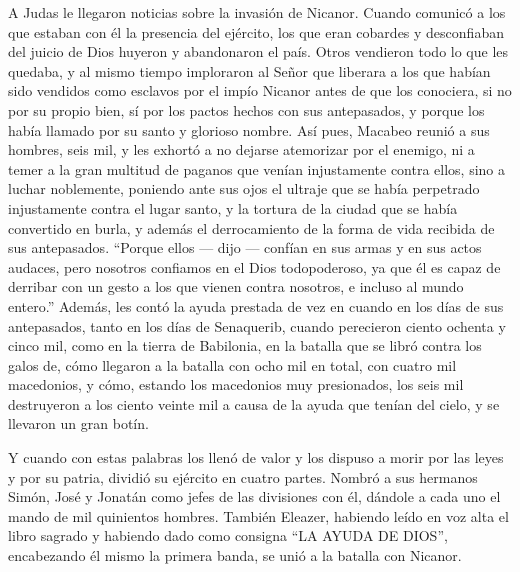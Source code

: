  A Judas le llegaron noticias sobre la invasión de
Nicanor. Cuando comunicó a los que estaban con él la presencia del
ejército,  los que eran cobardes y desconfiaban del
juicio de Dios huyeron y abandonaron el país.  Otros
vendieron todo lo que les quedaba, y al mismo tiempo imploraron al Señor
que liberara a los que habían sido vendidos como esclavos por el impío
Nicanor antes de que los conociera,  si no por su propio
bien, sí por los pactos hechos con sus antepasados, y porque los había
llamado por su santo y glorioso nombre.  Así pues,
Macabeo reunió a sus hombres, seis mil, y les exhortó a no dejarse
atemorizar por el enemigo, ni a temer a la gran multitud de paganos que
venían injustamente contra ellos, sino a luchar noblemente,
 poniendo ante sus ojos el ultraje que se había
perpetrado injustamente contra el lugar santo, y la tortura de la ciudad
que se había convertido en burla, y además el derrocamiento de la forma
de vida recibida de sus antepasados.  ``Porque ellos ---
dijo --- confían en sus armas y en sus actos audaces, pero nosotros
confiamos en el Dios todopoderoso, ya que él es capaz de derribar con un
gesto a los que vienen contra nosotros, e incluso al mundo entero.''
 Además, les contó la ayuda prestada de vez en cuando en
los días de sus antepasados, tanto en los días de Senaquerib, cuando
perecieron ciento ochenta y cinco mil,  como en la tierra
de Babilonia, en la batalla que se libró contra los galos de, cómo
llegaron a la batalla con ocho mil en total, con cuatro mil macedonios,
y cómo, estando los macedonios muy presionados, los seis mil destruyeron
a los ciento veinte mil a causa de la ayuda que tenían del cielo, y se
llevaron un gran botín.

 Y cuando con estas palabras los llenó de valor y los
dispuso a morir por las leyes y por su patria, dividió su ejército en
cuatro partes.  Nombró a sus hermanos Simón, José y
Jonatán como jefes de las divisiones con él, dándole a cada uno el mando
de mil quinientos hombres.  También Eleazer, habiendo
leído en voz alta el libro sagrado y habiendo dado como consigna ``LA
AYUDA DE DIOS'', encabezando él mismo la primera banda, se unió a la
batalla con Nicanor.

